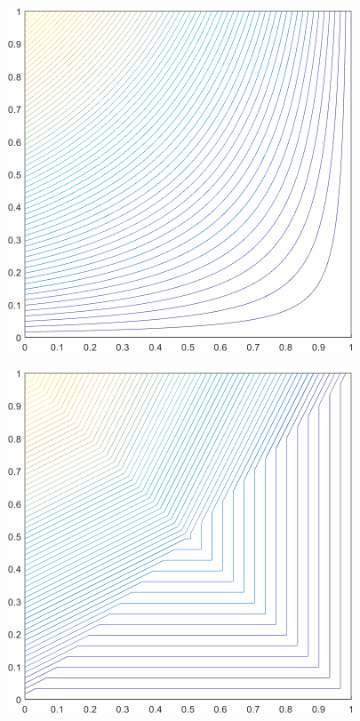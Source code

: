 \documentclass[11pt]{article}
\begin{document}
\begin{figure}
\centering
	\begin{subfigure}[b]{0.30\textwidth}
		\centering
		\includegraphics[width=\textwidth]{figures/square_WACHSPRESS1_contour_b4.png}
		\caption{}
	\end{subfigure}
	\hspace{1cm}
	\begin{subfigure}[b]{0.30\textwidth}
		\centering
		\includegraphics[width=\textwidth]{figures/square_PWLD1_contour_b4.png}

\end{subfigure}
\end{figure}
\end{document}

